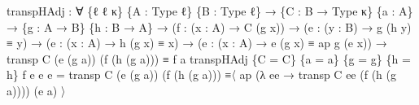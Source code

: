 \documentclass[
  11pt,
  oneside,
  article]{memoir}
\newenvironment{Shaded}{}{}
\newcommand{\NormalTok}[1]{#1}
\newcommand{\OtherTok}[1]{\textcolor[rgb]{0.00,0.44,0.13}{#1}}
\theoremstyle{definition}
\theoremstyle{plain}
\newcommand{\0}{\textsf{0}}
\newcommand{\1}{\tn{\textsf{1}}}
\begin{document}
\begin{Shaded}
\begin{Highlighting}[]
\NormalTok{transpHAdj }\OtherTok{:} \OtherTok{∀} \OtherTok{\{}\NormalTok{ℓ ℓ\textquotesingle{} κ}\OtherTok{\}} \OtherTok{\{}\NormalTok{A }\OtherTok{:}\NormalTok{ Type ℓ}\OtherTok{\}} \OtherTok{\{}\NormalTok{B }\OtherTok{:}\NormalTok{ Type ℓ\textquotesingle{}}\OtherTok{\}} 
            \OtherTok{→} \OtherTok{\{}\NormalTok{C }\OtherTok{:}\NormalTok{ B }\OtherTok{→}\NormalTok{ Type κ}\OtherTok{\}} \OtherTok{\{}\NormalTok{a }\OtherTok{:}\NormalTok{ A}\OtherTok{\}}
            \OtherTok{→} \OtherTok{\{}\NormalTok{g }\OtherTok{:}\NormalTok{ A }\OtherTok{→}\NormalTok{ B}\OtherTok{\}} \OtherTok{\{}\NormalTok{h }\OtherTok{:}\NormalTok{ B }\OtherTok{→}\NormalTok{ A}\OtherTok{\}} 
            \OtherTok{→} \OtherTok{(}\NormalTok{f }\OtherTok{:} \OtherTok{(}\NormalTok{x }\OtherTok{:}\NormalTok{ A}\OtherTok{)} \OtherTok{→}\NormalTok{ C }\OtherTok{(}\NormalTok{g x}\OtherTok{))} 
            \OtherTok{→} \OtherTok{(}\NormalTok{e }\OtherTok{:} \OtherTok{(}\NormalTok{y }\OtherTok{:}\NormalTok{ B}\OtherTok{)} \OtherTok{→}\NormalTok{ g }\OtherTok{(}\NormalTok{h y}\OtherTok{)}\NormalTok{ ≡ y}\OtherTok{)}
            \OtherTok{→} \OtherTok{(}\NormalTok{e\textquotesingle{} }\OtherTok{:} \OtherTok{(}\NormalTok{x }\OtherTok{:}\NormalTok{ A}\OtherTok{)} \OtherTok{→}\NormalTok{ h }\OtherTok{(}\NormalTok{g x}\OtherTok{)}\NormalTok{ ≡ x}\OtherTok{)}
            \OtherTok{→} \OtherTok{(}\NormalTok{e\textquotesingle{}\textquotesingle{} }\OtherTok{:} \OtherTok{(}\NormalTok{x }\OtherTok{:}\NormalTok{ A}\OtherTok{)} \OtherTok{→}\NormalTok{ e }\OtherTok{(}\NormalTok{g x}\OtherTok{)}\NormalTok{ ≡ ap g }\OtherTok{(}\NormalTok{e\textquotesingle{} x}\OtherTok{))}
            \OtherTok{→}\NormalTok{ transp C }\OtherTok{(}\NormalTok{e }\OtherTok{(}\NormalTok{g a}\OtherTok{))} \OtherTok{(}\NormalTok{f }\OtherTok{(}\NormalTok{h }\OtherTok{(}\NormalTok{g a}\OtherTok{)))}\NormalTok{ ≡ f a}
\NormalTok{transpHAdj }\OtherTok{\{}\NormalTok{C }\OtherTok{=}\NormalTok{ C}\OtherTok{\}} \OtherTok{\{}\NormalTok{a }\OtherTok{=}\NormalTok{ a}\OtherTok{\}} \OtherTok{\{}\NormalTok{g }\OtherTok{=}\NormalTok{ g}\OtherTok{\}} \OtherTok{\{}\NormalTok{h }\OtherTok{=}\NormalTok{ h}\OtherTok{\}}\NormalTok{ f e e\textquotesingle{} e\textquotesingle{}\textquotesingle{} }\OtherTok{=} 
\NormalTok{    transp C }\OtherTok{(}\NormalTok{e }\OtherTok{(}\NormalTok{g a}\OtherTok{))} \OtherTok{(}\NormalTok{f }\OtherTok{(}\NormalTok{h }\OtherTok{(}\NormalTok{g a}\OtherTok{)))}               
\NormalTok{        ≡〈 ap }\OtherTok{(λ}\NormalTok{ ee }\OtherTok{→}\NormalTok{ transp C ee }\OtherTok{(}\NormalTok{f }\OtherTok{(}\NormalTok{h }\OtherTok{(}\NormalTok{g a}\OtherTok{))))} \OtherTok{(}\NormalTok{e\textquotesingle{}\textquotesingle{} a}\OtherTok{)}\NormalTok{ 〉 }

\end{Highlighting}
\end{Shaded}
\end{document}
